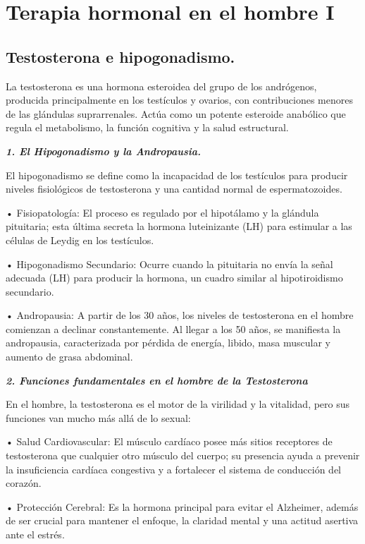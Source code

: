 \documentclass[
  spanish,
]{article}
\begin{document}
\section{Terapia hormonal en el hombre I}\label{hombre1}

\subsection{Testosterona e hipogonadismo.}\label{testosterona-e-hipogonadismo.}

La testosterona es una hormona esteroidea del grupo de los andrógenos, producida principalmente en los testículos y ovarios, con contribuciones menores de las glándulas suprarrenales. Actúa como un potente esteroide anabólico que regula el metabolismo, la función cognitiva y la salud estructural.

\textbf{\emph{1. El Hipogonadismo y la Andropausia.}}

El hipogonadismo se define como la incapacidad de los testículos para producir niveles fisiológicos de testosterona y una cantidad normal de espermatozoides.

• Fisiopatología: El proceso es regulado por el hipotálamo y la glándula pituitaria; esta última secreta la hormona luteinizante (LH) para estimular a las células de Leydig en los testículos.

• Hipogonadismo Secundario: Ocurre cuando la pituitaria no envía la señal adecuada (LH) para producir la hormona, un cuadro similar al hipotiroidismo secundario.

• Andropausia: A partir de los 30 años, los niveles de testosterona en el hombre comienzan a declinar constantemente. Al llegar a los 50 años, se manifiesta la andropausia, caracterizada por pérdida de energía, libido, masa muscular y aumento de grasa abdominal.

\textbf{\emph{2. Funciones fundamentales en el hombre de la Testosterona}}

En el hombre, la testosterona es el motor de la virilidad y la vitalidad, pero sus funciones van mucho más allá de lo sexual:

• Salud Cardiovascular: El músculo cardíaco posee más sitios receptores de testosterona que cualquier otro músculo del cuerpo; su presencia ayuda a prevenir la insuficiencia cardíaca congestiva y a fortalecer el sistema de conducción del corazón.

• Protección Cerebral: Es la hormona principal para evitar el Alzheimer, además de ser crucial para mantener el enfoque, la claridad mental y una actitud asertiva ante el estrés.
\end{document}
